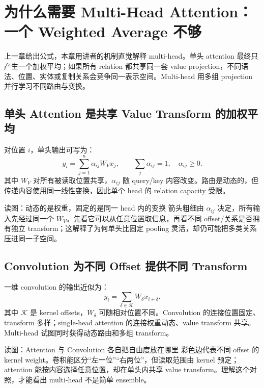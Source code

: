 \section{为什么需要 Multi-Head Attention：一个 Weighted Average 不够}

上一章给出公式，本章用讲者的机制直觉解释 multi-head。单头 attention 最终只产生一个加权平均；如果所有 relation 都共享同一套 value projection，不同语法、位置、实体或复制关系会竞争同一表示空间。Multi-head 用多组 projection 并行学习不同路由与变换。

\subsection{单头 Attention 是共享 Value Transform 的加权平均}

对位置 $i$，单头输出可写为：
\[
y_i=\sum_{j=1}^{n}\alpha_{ij}W_Vx_j,
\qquad \sum_j\alpha_{ij}=1,\quad \alpha_{ij}\ge 0.
\]
其中 $W_V$ 对所有被读取位置共享，$\alpha_{ij}$ 随 query/key 内容改变。路由是动态的，但传递内容使用同一线性变换，因此单个 head 的 relation capacity 受限。


\begin{knowledgebox}{读图：动态的是权重，固定的是同一 head 内的变换}
箭头粗细由 $\alpha_{ij}$ 决定，所有输入先经过同一个 $W_V$。先看它可以从任意位置取信息，再看不同 offset/关系是否拥有独立 transform；这解释了为何单头比固定 pooling 灵活，却仍可能把多类关系压进同一子空间。
\end{knowledgebox}

\subsection{Convolution 为不同 Offset 提供不同 Transform}

一维 convolution 的输出近似为：
\[
y_i=\sum_{\delta\in\mathcal{K}}W_{\delta}x_{i+\delta}.
\]
其中 $\mathcal{K}$ 是 kernel offsets，$W_{\delta}$ 可随相对位置不同。Convolution 的连接位置固定、transform 多样；single-head attention 的连接权重动态、value transform 共享。Multi-head 试图同时获得动态路由和多组 transform。


\begin{knowledgebox}{读图：Attention 与 Convolution 各自把自由度放在哪里}
彩色边代表不同 offset 的 kernel weight。卷积能区分“左一位”“右两位”，但读取范围由 kernel 预定；attention 能按内容选择任意位置，却在单头内共享 value transform。理解这个对照，才能看出 multi-head 不是简单 ensemble。
\end{knowledgebox}

